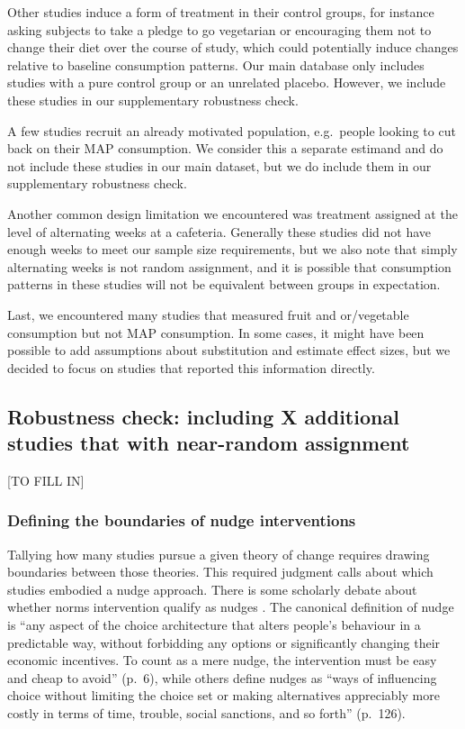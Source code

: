 \documentclass[sn-nature,pdflatex]{sn-jnl}
\begin{document}
Other studies induce a form of treatment in their control groups, for
instance asking subjects to take a pledge to go vegetarian or
encouraging them not to change their diet over the course of study,
which could potentially induce changes relative to baseline consumption
patterns. Our main database only includes studies with a pure control
group or an unrelated placebo. However, we include these studies in our
supplementary robustness check.

A few studies recruit an already motivated population, e.g.~people
looking to cut back on their MAP consumption. We consider this a
separate estimand and do not include these studies in our main dataset,
but we do include them in our supplementary robustness check.

Another common design limitation we encountered was treatment assigned
at the level of alternating weeks at a cafeteria. Generally these
studies did not have enough weeks to meet our sample size requirements,
but we also note that simply alternating weeks is not random assignment,
and it is possible that consumption patterns in these studies will not
be equivalent between groups in expectation.

Last, we encountered many studies that measured fruit and or/vegetable
consumption but not MAP consumption. In some cases, it might have been
possible to add assumptions about substitution and estimate effect
sizes, but we decided to focus on studies that reported this information
directly.

\subsection{Robustness check: including X additional studies that with
near-random
assignment}\label{robustness-check-including-x-additional-studies-that-with-near-random-assignment}

{[}TO FILL IN{]}

\subsubsection{Defining the boundaries of nudge
interventions}\label{defining-the-boundaries-of-nudge-interventions}

Tallying how many studies pursue a given theory of change requires
drawing boundaries between those theories. This required judgment calls
about which studies embodied a nudge approach. There is some scholarly
debate about whether norms intervention qualify as nudges
\citep{bicchieri2023}. The canonical definition of nudge
\citep{thaler2009} is ``any aspect of the choice architecture that
alters people's behaviour in a predictable way, without forbidding any
options or significantly changing their economic incentives. To count as
a mere nudge, the intervention must be easy and cheap to avoid'' (p.~6),
while others \citep{hausman2010} define nudges as ``ways of influencing
choice without limiting the choice set or making alternatives
appreciably more costly in terms of time, trouble, social sanctions, and
so forth'' (p.~126).
\end{document}
